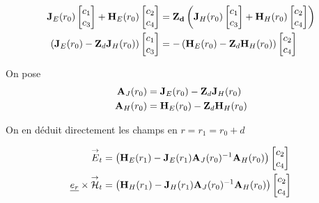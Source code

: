         \begin{align}
            \mathbf{J}_{E}(r_0)
            \begin{bmatrix}
                c_1 \\
                c_3
            \end{bmatrix}
            +
            \mathbf{H}_{E}(r_0)
            \begin{bmatrix}
                c_2 \\
                c_4
            \end{bmatrix}
            &=
            \mathbf{Z_{d}}
            \left(
                \mathbf{J}_{H}(r_0)
                \begin{bmatrix}
                    c_1 \\
                    c_3
                \end{bmatrix}
                +
                \mathbf{H}_{H}(r_0)
                \begin{bmatrix}
                    c_2 \\
                    c_4
                \end{bmatrix}
            \right)
            \\
            \left( \mathbf{J}_{E}(r_0) -  \mathbf{Z}_d \mathbf{J}_{H}(r_0) \right)
            \begin{bmatrix}
                c_1 \\
                c_3
            \end{bmatrix}
            &=
            -\left( \mathbf{H}_{E}(r_0) -  \mathbf{Z}_d \mathbf{H}_{H}(r_0) \right)
            \begin{bmatrix}
                c_2 \\
                c_4
            \end{bmatrix}
        \end{align}

        On pose 
        \begin{align}
            \mathbf{A}_J(r_0) &= \mathbf{J}_{E}(r_0) -  \mathbf{Z}_d \mathbf{J}_{H}(r_0)
            \\
            \mathbf{A}_H(r_0) &= \mathbf{H}_{E}(r_0) -  \mathbf{Z}_d \mathbf{H}_{H}(r_0)
        \end{align}


        On en déduit directement les champs en $r=r_1=r_0+d$

        \begin{align}
            {\overset{\rightarrow}{E}}_t &= 
            \left(\mathbf{H}_{E}(r_1) - \mathbf{J}_{E}(r_1)\mathbf{A}_{J}(r_0)^{-1}\mathbf{A}_{H}(r_0)\right)
            \begin{bmatrix}
                c_2 \\
                c_4
            \end{bmatrix}
            \\
            \underline{e_r}\times{\overset{\rightarrow}{\mathcal{H}}}_t &= 
            \left(\mathbf{H}_{H}(r_1) - \mathbf{J}_{H}(r_1)\mathbf{A}_{J}(r_0)^{-1}\mathbf{A}_{H}(r_0) \right)
            \begin{bmatrix}
                c_2 \\
                c_4
            \end{bmatrix}
        \end{align}

